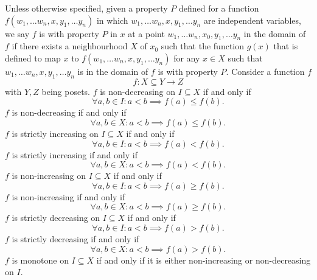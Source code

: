 \documentclass[a4paper,12pt]{report}
\begin{document}
Unless otherwise specified, given a property $P$ defined for a function $f(w_1,\dots w_n,x,y_1,\dots y_n)$ in which $w_1,\dots w_n,x,y_1,\dots y_n$ are independent variables, we say $f$ is with property $P$ in $x$ at a point $w_1,\dots w_n,x_0,y_1,\dots y_n$ in the domain of $f$ if there exists a neighbourhood $X$ of $x_0$ such that the function $g(x)$ that is defined to map $x$ to $f(w_1,\dots w_n,x,y_1,\dots y_n)$ for any $x\in X$ such that $w_1,\dots w_n,x,y_1,\dots y_n$ is in the domain of $f$ is with property $P$.
Consider a function $f$
\[f\colon X\subseteq Y\to Z\]
with $Y,Z$ being posets.
$f$ is non-decreasing on $I\subseteq X$ if and only if
\[\forall a,b\in I\colon a<b\implies f(a)\leq f(b).\]
$f$ is non-decreasing if and only if
\[\forall a,b\in X\colon a<b\implies f(a)\leq f(b).\]
$f$ is strictly increasing on $I\subseteq X$ if and only if
\[\forall a,b\in I\colon a<b\implies f(a)<f(b).\]
$f$ is strictly increasing if and only if
\[\forall a,b\in X\colon a<b\implies f(a)<f(b).\]
$f$ is non-increasing on $I\subseteq X$ if and only if
\[\forall a,b\in I\colon a<b\implies f(a)\geq f(b).\]
$f$ is non-increasing if and only if
\[\forall a,b\in X\colon a<b\implies f(a)\geq f(b).\]
$f$ is strictly decreasing on $I\subseteq X$ if and only if
\[\forall a,b\in I\colon a<b\implies f(a)>f(b).\]
$f$ is strictly decreasing if and only if
\[\forall a,b\in X\colon a<b\implies f(a)>f(b).\]
$f$ is monotone on $I\subseteq X$ if and only if it is either non-increasing or non-decreasing on $I$.
\end{document}
